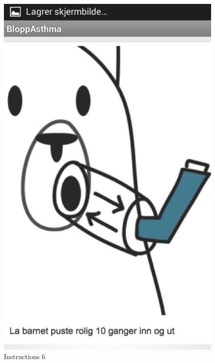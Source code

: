 \begin{figure}[H]
\begin{minipage}[b]{0.3\linewidth}
		\includegraphics[width=0.20\paperwidth]{Pictures/app-screenshots/instructions-6.png}
		\caption{Instructions 6}
		\label{fig:instructions-6}
	\end{minipage}
	

\end{figure}
